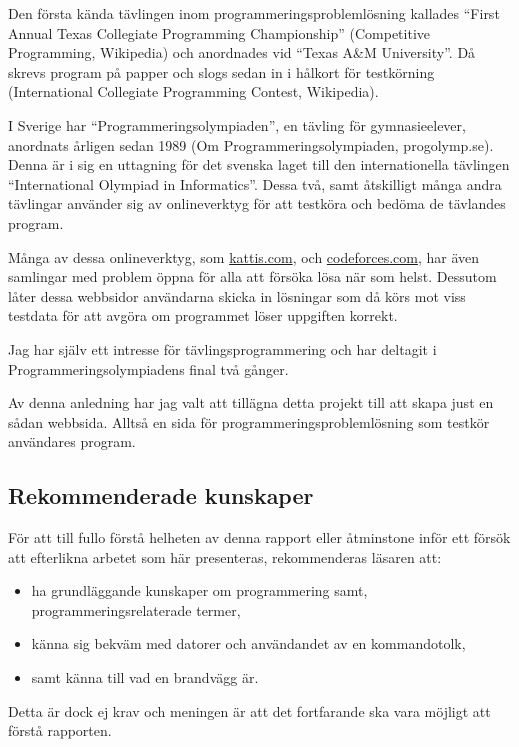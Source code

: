 \documentclass{article}
\begin{document}
Den första kända tävlingen inom programmeringsproblemlösning kallades ``First
Annual Texas Collegiate Programming Championship'' (Competitive Programming,
Wikipedia) och anordnades vid ``Texas A\&M University''. Då skrevs program på
papper och slogs sedan in i hålkort för testkörning (International Collegiate
Programming Contest, Wikipedia).

I Sverige har ``Programmeringsolympiaden'', en tävling för gymnasieelever,
anordnats årligen sedan 1989 (Om Programmeringsolympiaden, progolymp.se). Denna
är i sig en uttagning för det svenska laget till den internationella tävlingen
``International Olympiad in Informatics''.  Dessa två, samt åtskilligt många
andra tävlingar använder sig av onlineverktyg för att testköra och bedöma de
tävlandes program.

Många av dessa onlineverktyg, som \href{https://open.kattis.com}{kattis.com},
och \href{https://codefoces.com}{codeforces.com}, har även samlingar med problem
öppna för alla att försöka lösa när som helst. Dessutom låter dessa webbsidor
användarna skicka in lösningar som då körs mot viss testdata för att avgöra om
programmet löser uppgiften korrekt.

Jag har själv ett intresse för tävlingsprogrammering och har deltagit i
Programmeringsolympiadens final två gånger.


Av denna anledning har jag valt att tillägna detta projekt till att skapa just
en sådan webbsida. Alltså en sida för programmeringsproblemlösning som testkör
användares program.

\subsection{Rekommenderade kunskaper}

För att till fullo förstå helheten av denna rapport eller åtminstone inför ett
försök att efterlikna arbetet som här presenteras, rekommenderas läsaren att:

\begin{itemize}
	\item ha grundläggande kunskaper om programmering samt,
		programmeringsrelaterade termer,
	\item känna sig bekväm med datorer och användandet av en kommandotolk,
	\item samt känna till vad en brandvägg är.
\end{itemize}

Detta är dock ej krav och meningen är att det fortfarande ska vara möjligt att
förstå rapporten.
\end{document}
